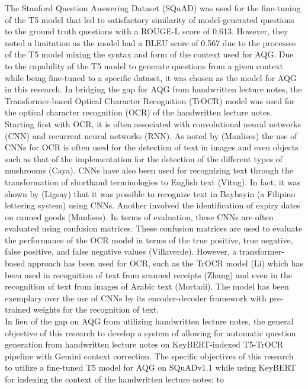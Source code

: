 \documentclass[conference]{IEEEtran}
\begin{document}
The Stanford Question Answering Dataset (SQuAD) was used for the 
fine-tuning of the T5 model that led to satisfactory similarity of model-generated
questions to the ground truth questions with a ROUGE-L score of 0.613. However,
they noted a limitation as the model had a BLEU score of 0.567 due to the processes
of the T5 model mixing the syntax and form of the context used for AQG. Due to 
the capability of the T5 model to generate questions from a given context while 
being fine-tuned to a specific dataset, it was chosen as the model for AQG in this 
research. In bridging the gap for AQG from handwritten lecture notes,
the Transformer-based Optical Character Recognition (TrOCR) model was used for the optical character recognition (OCR) of the 
handwritten lecture notes. Starting first with OCR, it is often associated with 
convolutional neural networks (CNN) and recurrent neural networks (RNN). As noted 
by (Manlises) the use of CNNs for OCR is often used for the detection of text
in images and even objects such as that of the implementation for the detection 
of the different types of mushrooms (Caya). CNNs have also been used for 
recognizing text through the transformation of shorthand terminologies to 
English text (Vitug). In fact, it was shown by (Ligsay) that it was 
possible to recognize text in Baybayin (a Filipino lettering system) 
using CNNs. Another involved the identification of expiry dates on 
canned goods (Manlises). In terms of evaluation, these CNNs are often evaluated 
using confusion matrices. These confusion matrices are used to evaluate the
performance of the OCR model in terms of the true positive, true negative, false
positive, and false negative values (Villaverde). However, a transformer-based
approach has been used for OCR, such as the TrOCR model (Li) which has been used in recognition of text from 
scanned receipts (Zhang) and even in the recognition of text from images of 
Arabic text (Mortadi). The model has been exemplary over the use of CNNs by its 
encoder-decoder framework with pre-trained weights for the recognition of text.
\\
\indent In lieu of the gap on AQG from utilizing handwritten lecture notes, 
the general objective of this research to develop a system of allowing for
automatic question generation from handwritten lecture notes on KeyBERT-indexed 
T5-TrOCR pipeline with Gemini context correction. The specific objectives of
this research to utilize a fine-tuned T5 model for AQG on SQuADv1.1 while 
using KeyBERT for indexing the context of the handwritten lecture notes; to 
\end{document}
